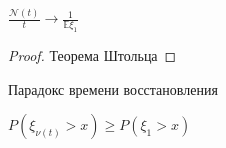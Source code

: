\begin{consequence}
    $\frac{\mathcal{N} (t)}{t} \rightarrow \frac{1}{\mathbb{E} \xi_1}$
\end{consequence}

\begin{proof}
    Теорема Штольца
\end{proof}

\begin{remark}
    Парадокс времени восстановления

    $P(\xi_{\nu (t)} > x) \geqslant P(\xi_1 > x)$
\end{remark}
